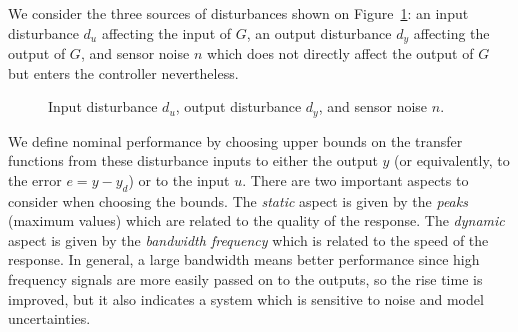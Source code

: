 \documentclass[12pt,lot, lof]{puthesis}
\begin{document}
We consider the three sources of disturbances shown on Figure~\ref{fig:disturbances}: an input disturbance $d_u$ affecting the input of $G$, an output disturbance $d_y$ affecting the output of $G$, and sensor noise $n$ which does not directly affect the output of $G$ but enters the controller nevertheless.

\begin{figure}[htbp]
	\centering
	\caption{Input disturbance $d_u$, output disturbance $d_y$, and sensor noise $n$.}
	\label{fig:disturbances}
\end{figure}

We define nominal performance by choosing upper bounds on the transfer functions from these disturbance inputs to either the output $y$ (or equivalently, to the error $e = y - y_d$) or to the input $u$.
There are two important aspects to consider when choosing the bounds.
The \emph{static} aspect is given by the \emph{peaks} (maximum values) which are related to the quality of the response.
The \emph{dynamic} aspect is given by the \emph{bandwidth frequency} which is related to the speed of the response.
In general, a large bandwidth means better performance since high frequency signals are more easily passed on to the outputs, so the rise time is improved, but it also indicates a system which is sensitive to noise and model uncertainties.
\end{document}
